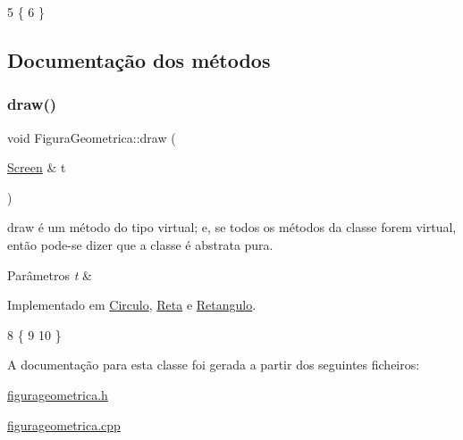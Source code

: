 \begin{DoxyCode}
5 \{
6 \}
\end{DoxyCode}


\subsection{Documentação dos métodos}
\mbox{\label{class_figura_geometrica_a06404670d06d28d12f5f386901186925}} 
\subsubsection{\texorpdfstring{draw()}{draw()}}
{\footnotesize\ttfamily void Figura\+Geometrica\+::draw (\begin{DoxyParamCaption}\item[{\hyperlink{class_screen}{Screen} \&}]{t }\end{DoxyParamCaption})\hspace{0.3cm}{\ttfamily [pure virtual]}}



draw é um método do tipo virtual; e, se todos os métodos da classe forem virtual, então pode-\/se dizer que a classe é abstrata pura. 


\begin{DoxyParams}{Parâmetros}
{\em t} & \\
\hline
\end{DoxyParams}


Implementado em \hyperlink{class_circulo_a593787d6e0618c2eded23e8839e7bea6}{Circulo}, \hyperlink{class_reta_ac2e9805183cd474b62bffd8b032cd780}{Reta} e \hyperlink{class_retangulo_ac088dd6d3f4f3d3f80363a868c2e74f1}{Retangulo}.


\begin{DoxyCode}
8                                      \{
9 
10 \}
\end{DoxyCode}


A documentação para esta classe foi gerada a partir dos seguintes ficheiros\+:\begin{DoxyCompactItemize}
\item 
\hyperlink{figurageometrica_8h}{figurageometrica.\+h}\item 
\hyperlink{figurageometrica_8cpp}{figurageometrica.\+cpp}\end{DoxyCompactItemize}
